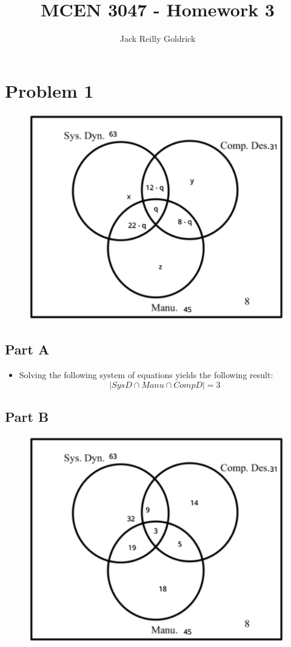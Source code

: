 \documentclass[]{report}
\title{MCEN 3047 - Homework 3}
\author{Jack Reilly Goldrick}
\begin{document}
	\maketitle
	
	
	\section{Problem 1}
	
	
		\begin{figure}[H]
			\centering
			\includegraphics[width=0.7\linewidth]{./pics/1}
		\end{figure}
	
		\subsection{Part A}
			\begin{itemize}
				\item Solving the following system of equations yields the following result:
				$$ |SysD \cap Manu \cap CompD | = 3 $$
			\end{itemize}
			
			
			\subsection{Part B}
			
			
					\begin{figure}[H]
						\centering
							\includegraphics[width=0.7\linewidth]{./pics/1.b}
					\end{figure}
\end{document}
